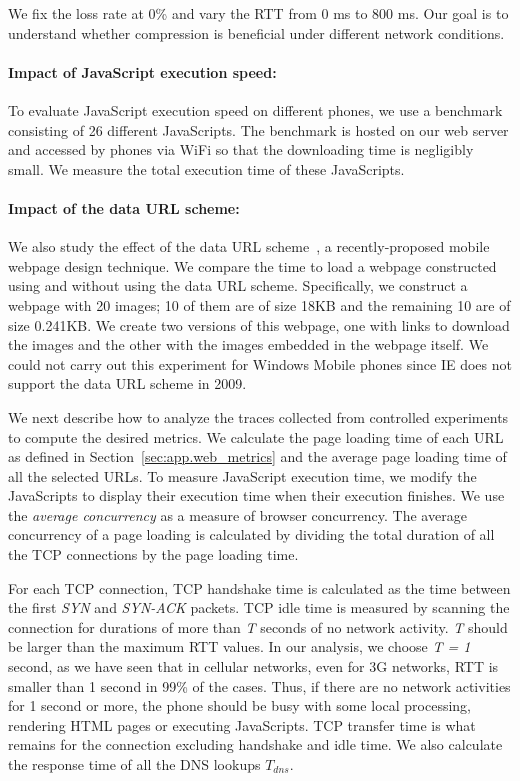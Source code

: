 We fix the loss rate at 0\% and vary the RTT from 0 ms to 800 ms. Our goal is to understand whether compression is beneficial under different network conditions.

\paragraph{Impact of JavaScript execution speed:} To evaluate 
JavaScript execution speed on different phones, we use a 
benchmark~\cite{sunspider} consisting of 26 different JavaScripts. 
The benchmark is hosted on our web server and accessed by phones 
via WiFi so that the downloading time is negligibly small. We 
measure the total execution time of these JavaScripts. 

\paragraph{Impact of the data URL scheme:} We also study the effect 
of the data URL scheme~\cite{rfc2397}, a recently-proposed mobile 
webpage design technique. We compare the time to load a webpage 
constructed using and without using the data URL scheme. 
Specifically, we construct a webpage with 20 images; 10 of them are of size 18KB and the remaining 10 are of size 0.241KB. We create two versions of this webpage, one with links to download the images and the other with the images embedded in the webpage itself. We could not carry out this experiment for Windows Mobile phones since IE does not support the data URL scheme in 2009.



We next describe how to analyze the traces collected from controlled
experiments to compute the desired metrics. We calculate the page 
loading time of each URL as defined in Section~\ref{sec:app.web_metrics} 
and the average page loading time of all the selected URLs. To measure 
JavaScript execution time, we modify the JavaScripts to display their 
execution time when their execution finishes. We use the
{\em average concurrency} as a measure of browser concurrency. The
average concurrency of a page loading is calculated by dividing the 
total duration of all the TCP connections by the page loading time. 

For each TCP connection, TCP handshake time is calculated as the time
between the first \emph{SYN} and \emph{SYN-ACK} packets. TCP idle time 
is measured by scanning the connection for durations of more than 
\emph{T} seconds of no network activity. \emph{T} should be larger 
than the maximum RTT values. In our analysis, we choose \emph{T = 1} second, as we have seen that in cellular networks, even for 3G networks, RTT is smaller than 1 second in 99\% of the cases. Thus, if there
are no network activities for 1 second or more, the phone should 
be busy with some local processing, \eg rendering HTML pages or executing JavaScripts.
TCP transfer time is what remains for the connection excluding handshake and idle time. 
We also calculate the response time of all the DNS lookups $T_{dns}$. 

